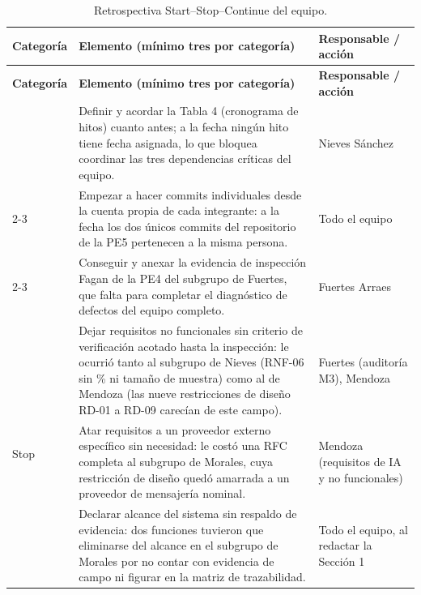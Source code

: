 \documentclass[12pt,a4paper]{article}
\begin{document}
\begin{longtable}{|p{2.2cm}|p{7.3cm}|p{4.3cm}|}
	\caption{Retrospectiva Start--Stop--Continue del equipo.} \label{tab:retrospectiva} \\
	\hline
	\textbf{Categoría} & \textbf{Elemento (mínimo tres por categoría)} & \textbf{Responsable / acción} \\
	\hline
	\endfirsthead
	\hline
	\textbf{Categoría} & \textbf{Elemento (mínimo tres por categoría)} & \textbf{Responsable / acción} \\
	\hline
	\endhead
	\hline
	\endfoot
	\hline
	\endlastfoot

	\multirow{3}{*}{Start}
	& Definir y acordar la Tabla 4 (cronograma de hitos) cuanto antes; a la fecha ningún hito tiene fecha asignada, lo que bloquea coordinar las tres dependencias críticas del equipo. & Nieves Sánchez \\
	\cline{2-3}
	& Empezar a hacer commits individuales desde la cuenta propia de cada integrante: a la fecha los dos únicos commits del repositorio de la PE5 pertenecen a la misma persona. & Todo el equipo \\
	\cline{2-3}
	& Conseguir y anexar la evidencia de inspección Fagan de la PE4 del subgrupo de Fuertes, que falta para completar el diagnóstico de defectos del equipo completo. & Fuertes Arraes \\
	\hline

	\multirow{3}{*}{Stop}
	& Dejar requisitos no funcionales sin criterio de verificación acotado hasta la inspección: le ocurrió tanto al subgrupo de Nieves (RNF-06 sin \% ni tamaño de muestra) como al de Mendoza (las nueve restricciones de diseño RD-01 a RD-09 carecían de este campo). & Fuertes (auditoría M3), Mendoza \\
	\cline{2-3}
	& Atar requisitos a un proveedor externo específico sin necesidad: le costó una RFC completa al subgrupo de Morales, cuya restricción de diseño quedó amarrada a un proveedor de mensajería nominal. & Mendoza (requisitos de IA y no funcionales) \\
	\cline{2-3}
	& Declarar alcance del sistema sin respaldo de evidencia: dos funciones tuvieron que eliminarse del alcance en el subgrupo de Morales por no contar con evidencia de campo ni figurar en la matriz de trazabilidad. & Todo el equipo, al redactar la Sección 1 \\
	\hline


\end{longtable}
\end{document}
